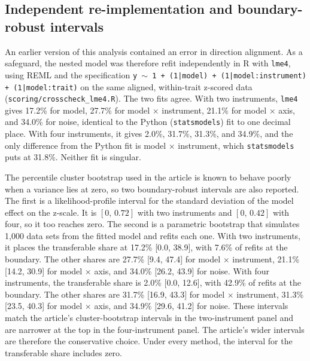 \documentclass[12pt]{article}
\begin{document}
\subsection{Independent re-implementation and boundary-robust intervals}
\label{si:lme4}
An earlier version of this analysis contained an error in direction alignment. As a safeguard, the nested
model was therefore refit independently in R with \texttt{lme4}, using REML and the specification \texttt{y $\sim$ 1 +
(1|model) + (1|model:instrument) + (1|model:trait)} on the same aligned, within-trait z-scored data
(\texttt{scoring/crosscheck\_lme4.R}). The two fits agree. With two instruments, \texttt{lme4} gives 17.2\% for model,
27.7\% for model $\times$ instrument, 21.1\% for model $\times$ axis, and 34.0\% for noise, identical to the Python
(\texttt{statsmodels}) fit to one decimal place. With four instruments, it gives 2.0\%, 31.7\%, 31.3\%, and 34.9\%,
and the only difference from the Python fit is model $\times$ instrument, which \texttt{statsmodels} puts at 31.8\%.
Neither fit is singular.

The percentile cluster bootstrap used in the article is known to behave poorly when a variance lies at
zero, so two boundary-robust intervals are also reported. The first is a likelihood-profile interval for the
standard deviation of the model effect on the z-scale. It is $[0,\,0.72]$ with two instruments and $[0,\,0.42]$
with four, so it too reaches zero. The second is a parametric bootstrap that simulates 1{,}000 data sets
from the fitted model and refits each one. With two instruments, it places the transferable share at
17.2\% [0.0, 38.9], with 7.6\% of refits at the boundary. The other shares are 27.7\% [9.4, 47.4] for model $\times$
instrument, 21.1\% [14.2, 30.9] for model $\times$ axis, and 34.0\% [26.2, 43.9] for noise. With four instruments,
the transferable share is 2.0\% [0.0, 12.6], with 42.9\% of refits at the boundary. The other shares are
31.7\% [16.9, 43.3] for model $\times$ instrument, 31.3\% [23.5, 40.3] for model $\times$ axis, and 34.9\% [29.6, 41.2] for
noise. These intervals match the article's cluster-bootstrap intervals in the two-instrument panel and are
narrower at the top in the four-instrument panel. The article's wider intervals are therefore the
conservative choice. Under every method, the interval for the transferable share includes zero.
\end{document}
